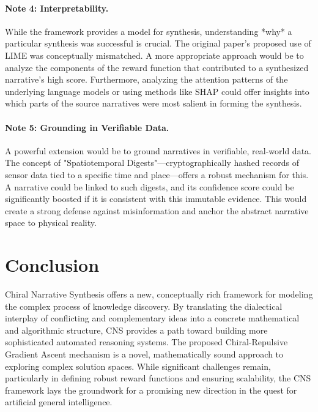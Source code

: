 \documentclass[12pt, a4paper]{article}
\begin{document}
\paragraph{Note 4: Interpretability.}
While the framework provides a model for synthesis, understanding *why* a particular synthesis was successful is crucial. The original paper's proposed use of LIME \cite{Ribeiro2016LIME} was conceptually mismatched. A more appropriate approach would be to analyze the components of the reward function that contributed to a synthesized narrative's high score. Furthermore, analyzing the attention patterns of the underlying language models or using methods like SHAP \cite{Lundberg2017SHAP} could offer insights into which parts of the source narratives were most salient in forming the synthesis.

\paragraph{Note 5: Grounding in Verifiable Data.}
A powerful extension would be to ground narratives in verifiable, real-world data. The concept of "Spatiotemporal Digests"—cryptographically hashed records of sensor data tied to a specific time and place—offers a robust mechanism for this. A narrative could be linked to such digests, and its confidence score could be significantly boosted if it is consistent with this immutable evidence. This would create a strong defense against misinformation and anchor the abstract narrative space to physical reality.

\section{Conclusion}
Chiral Narrative Synthesis offers a new, conceptually rich framework for modeling the complex process of knowledge discovery. By translating the dialectical interplay of conflicting and complementary ideas into a concrete mathematical and algorithmic structure, CNS provides a path toward building more sophisticated automated reasoning systems. The proposed Chiral-Repulsive Gradient Ascent mechanism is a novel, mathematically sound approach to exploring complex solution spaces. While significant challenges remain, particularly in defining robust reward functions and ensuring scalability, the CNS framework lays the groundwork for a promising new direction in the quest for artificial general intelligence.
\end{document}
